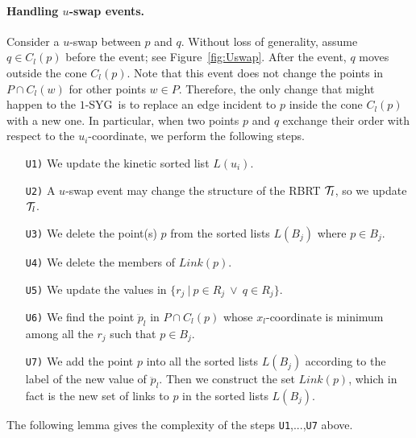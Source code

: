 \documentclass[preprint,12pt]{elsarticle}
\def\1syg{\mbox{$1$-SYG}}
\begin{document}
\paragraph{Handling $u$-swap events.} Consider a $u$-swap between $p$ and $q$. Without loss of generality, assume $q\in C_l(p)$ before the event; see Figure~\ref{fig:Uswap}. After the event, $q$ moves outside the cone $C_l(p)$. Note that this event does not change the points in $P\cap C_l(w)$ for other points $w\in P$. Therefore, the only change that might happen to the \1syg~is to replace an edge incident to $p$ inside the cone $C_l(p)$ with a new one. In particular, when two points $p$ and $q$ exchange their order with respect to the $u_i$-coordinate, we perform the following steps.
\begin{itemize}
\item[\texttt{U1)}] We update the kinetic sorted list $L(u_i)$.
\item[\texttt{U2)}] A $u$-swap event may change the structure of the RBRT ${\cal T}_l$, so we update ${\cal T}_l$.
\item[\texttt{U3)}] We delete the point(s) $p$ from the sorted lists $L(B_j)$ where $p\in B_j$.
\item[\texttt{U4)}] We delete the members of $Link(p)$.
\item[\texttt{U5)}] We update the values in $\{r_j~|~p\in R_j~\vee~q\in R_j\}$.
\item[\texttt{U6)}] We find the point $\ddot{p}_l$ in $P\cap C_l(p)$ whose $x_l$-coordinate is minimum among all the $r_j$ such that $p\in B_j$.
\item[\texttt{U7)}] We add the point $p$ into all the sorted lists $L(B_j)$ according to the label of the new value of $\ddot{p}_l$. Then we construct the set $Link(p)$, which in fact is the new set of links to $p$ in the sorted lists $L(B_j)$.
\end{itemize}

The following lemma gives the complexity of the steps \texttt{U1},...,\texttt{U7} above.
\end{document}
